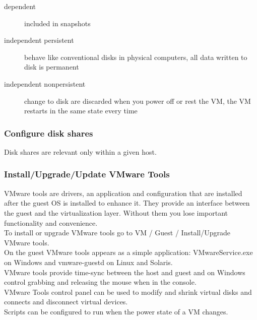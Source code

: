 \begin{description}

\item[dependent]
included in snapshots

\item[independent persistent]
behave like conventional disks in physical computers, all data written to
disk is permanent

\item[independent nonpersistent]
change to disk are discarded when you power off or rest the VM, the VM restarts
in the same state every time

\end{description}

\subsubsection{Configure disk shares}

Disk shares are relevant only within a given host.

\subsubsection{Install/Upgrade/Update VMware Tools}

VMware tools are drivers, an application and configuration that are installed
after the guest OS is installed to enhance it. They provide an interface
between the guest and the virtualization layer. Without them you lose
important functionality and convenience.\\

To install or upgrade VMware tools go to VM / Guest / Install/Upgrade VMware
tools.\\

On the guest VMware tools appears as a simple application: VMwareService.exe
on Windows and vmware-guestd on Linux and Solaris.\\

VMware tools provide time-sync between the host and guest and on Windows
control grabbing and releasing the mouse when in the console.\\

VMware Tools control panel can be used to modify and shrink virtual disks and
connects and disconnect virtual devices.\\

Scripts can be configured to run when the power state of a VM changes.\\

